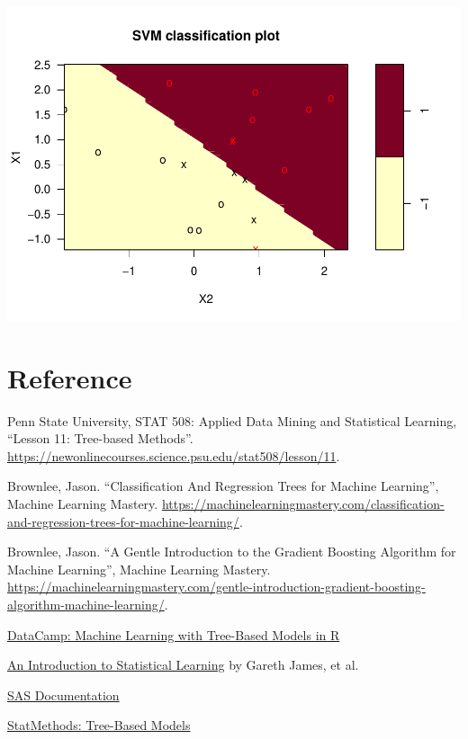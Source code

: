\documentclass[
]{book}
\begin{document}
\includegraphics{data-sci_files/figure-latex/unnamed-chunk-93-1.pdf}

\hypertarget{reference}{%
\section{Reference}\label{reference}}

Penn State University, STAT 508: Applied Data Mining and Statistical Learning, ``Lesson 11: Tree-based Methods''. \url{https://newonlinecourses.science.psu.edu/stat508/lesson/11}.

Brownlee, Jason. ``Classification And Regression Trees for Machine Learning'', Machine Learning Mastery. \url{https://machinelearningmastery.com/classification-and-regression-trees-for-machine-learning/}.

Brownlee, Jason. ``A Gentle Introduction to the Gradient Boosting Algorithm for Machine Learning'', Machine Learning Mastery. \url{https://machinelearningmastery.com/gentle-introduction-gradient-boosting-algorithm-machine-learning/}.

\href{https://campus.datacamp.com/courses/machine-learning-with-tree-based-models-in-r}{DataCamp: Machine Learning with Tree-Based Models in R}

\href{http://faculty.marshall.usc.edu/gareth-james/ISL/}{An Introduction to Statistical Learning} by Gareth James, et al.

\href{http://support.sas.com/documentation/cdl/en/stathpug/68163/HTML/default/viewer.htm\#stathpug_hpsplit_details01.htm}{SAS Documentation}

\href{https://www.statmethods.net/advstats/cart.html}{StatMethods: Tree-Based Models}
\end{document}
